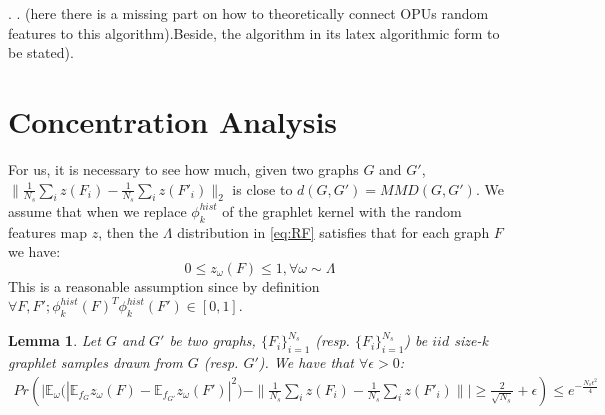 .
.
(here there is a missing part on how to theoretically connect OPUs random features to this algorithm).Beside, the algorithm in its latex algorithmic form to be stated).

\section{Concentration Analysis}
For us, it is necessary to see how much, given two graphs $G$ and $G'$, $\|\frac{1}{{N_s}} \sum_i z(F_i) - \frac{1}{{N_s}} \sum_i z(F'_i)\|_2$ is close to $d(G,G')= MMD (G,G')$.
We assume that when we replace $\phi_k^{hist}$ of the graphlet kernel with the random features map $z$, then the $\Lambda$ distribution in \eqref{eq:RF} satisfies that for each graph $F$ we have:
\begin{equation}
\label{eq:z_assumption}
    0\leq z_\omega(F)\leq 1, \forall \omega \sim  \Lambda
\end{equation}
This is a reasonable assumption since by definition $\forall F,F'; \phi_k^{hist}(F)^T\phi_k^{hist}(F') \in [0,1]$.
\newtheorem{lemma}{Lemma} 
\begin{lemma}
Let $G$ and $G'$ be two graphs, $\{F_i\}_{i=1}^{N_s}$ (resp. $\{F_i\}_{i=1}^{N_s}$) be $iid$ size-k graphlet samples drawn from $G$ (resp. $G'$). We have that $\forall \epsilon >0$:
\begin{align*}
    Pr(\Big | \mathbb{E}_{\omega} \Big( | \mathbb{E}_{f_G} z_\omega(F) - \mathbb{E}_{f_{G'}} z_\omega(F') |^2 \Big) - \| \frac{1}{N_s} \sum_i z(F_i) - \frac{1}{N_s} \sum_i z(F'_i)\|\Big | \geq
    \frac{2}{\sqrt{N_s}}+\epsilon)\leq e^{-\frac{N_s\epsilon^2}{4}}
\end{align*}
\end{lemma}

